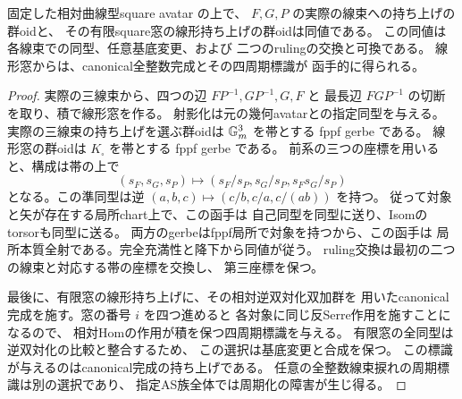 \begin{corollary}[実際の三線束の選択と線形窓の群oid]
\label{cor:qa-avatar-line-window-gerbe}
固定した相対曲線型square avatar の上で、
$F,G,P$ の実際の線束への持ち上げの群oidと、
その有限square窓の線形持ち上げの群oidは同値である。
この同値は各線束での同型、任意基底変更、および
二つのrulingの交換と可換である。
線形窓からは、canonical全整数完成とその四周期標識が
函手的に得られる。
\end{corollary}
\begin{proof}
実際の三線束から、四つの辺 $FP^{-1},GP^{-1},G,F$ と
最長辺 $FGP^{-1}$ の切断を取り、積で線形窓を作る。
射影化は元の幾何avatarとの指定同型を与える。
実際の三線束の持ち上げを選ぶ群oidは
$\mathbb G_m^3$ を帯とする fppf gerbe である。
線形窓の群oidは $K_\square$ を帯とする fppf gerbe である。
前系の三つの座標を用いると、構成は帯の上で
\[
 (s_F,s_G,s_P)
 \longmapsto(s_F/s_P, s_G/s_P, s_Fs_G/s_P)
\]
となる。この準同型は逆
$(a,b,c)\mapsto(c/b,c/a,c/(ab))$ を持つ。
従って対象と矢が存在する局所chart上で、この函手は
自己同型を同型に送り、Isomのtorsorも同型に送る。
両方のgerbeはfppf局所で対象を持つから、この函手は
局所本質全射である。完全充満性と降下から同値が従う。
ruling交換は最初の二つの線束と対応する帯の座標を交換し、
第三座標を保つ。

最後に、有限窓の線形持ち上げに、その相対逆双対化双加群を
用いたcanonical完成を施す。窓の番号 $i$ を四つ進めると
各対象に同じ反Serre作用を施すことになるので、
相対Homの作用が積を保つ四周期標識を与える。
有限窓の全同型は逆双対化の比較と整合するため、
この選択は基底変更と合成を保つ。
この標識が与えるのはcanonical完成の持ち上げである。
任意の全整数線束捩れの周期標識は別の選択であり、
指定AS族全体では周期化の障害が生じ得る。
\end{proof}

